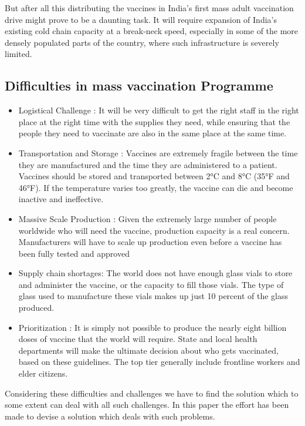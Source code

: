 \documentclass[10pt,twocolumn,letterpaper]{article}
\begin{document}
But after all this distributing the vaccines in India’s first mass adult vaccination drive might prove to be a daunting task. It will require expansion of India’s existing cold chain capacity at a break-neck speed, especially in some of the more densely populated parts of the country, where such infrastructure is severely limited.~\cite{Authors14b}

\subsection{Difficulties in mass vaccination Programme}
\begin{itemize}
    \item Logistical Challenge : It will be very difficult to get the right staff in the right place at the right time with the supplies they need, while ensuring that the people they need to vaccinate are also in the same place at the same time.~\cite{Alpher03}
    \item Transportation and Storage : Vaccines are extremely fragile between the time they are manufactured and the time they are administered to a patient. Vaccines should be stored and transported between 2°C and 8°C (35°F and 46°F). If the temperature varies too greatly, the vaccine can die and become inactive and ineffective. ~\cite{Alpher04}
    \item Massive Scale Production : Given the extremely large number of people worldwide who will need the vaccine, production capacity is a real concern. Manufacturers will have to scale up production even before a vaccine has been fully tested and approved ~\cite{Alpher04}
    \item Supply chain shortages: The world does not have enough glass vials to store and administer the vaccine, or the capacity to fill those vials. The type of glass used to manufacture these vials makes up just 10 percent of the glass produced. ~\cite{Alpher04}
    \item Prioritization : It is simply not possible to produce the nearly eight billion doses of vaccine that the world will require. State and local health departments will make the ultimate decision about who gets vaccinated, based on these guidelines. The top tier generally include frontline workers and elder citizens.
\end{itemize}

Considering these difficulties and challenges we have to find the solution which to some extent can deal with all such challenges. In this paper the effort has been made to devise a solution which deals with such problems.
\end{document}
